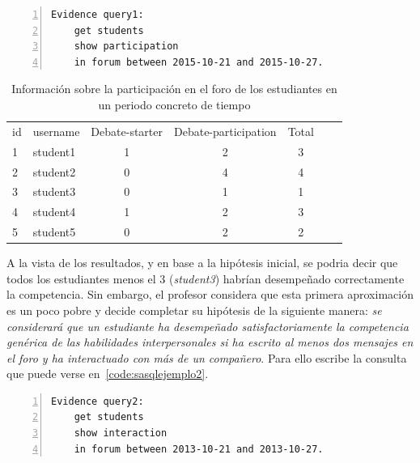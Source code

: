 \begin{lstlisting}[caption=Participación en el foro en un periodo concreto de tiempo ,label=code:sasqlejemplo1,numbers=left, captionpos=b, morekeywords={Evidence,get, students, show, milestones, participation, access, in, assignment, forum, campus, workshop, interaction, between, and}]
Evidence query1: 
	get students
	show participation
	in forum between 2015-10-21 and 2015-10-27.
\end{lstlisting}

\begin{table}
	\centering
	\caption{Información sobre la participación en el foro de los estudiantes en un periodo concreto de tiempo}
	\label{tab:EvalCourseEj1}
	\begin{tabular}{llccccc}
		\hline\noalign{\smallskip}
		id & username & Debate-starter & Debate-participation & Total \\
		\noalign{\smallskip}
		\hline
		\noalign{\smallskip}
		1 & student1 & 1 & 2 & 3  \\
		2 & student2 & 0 & 4 & 4  \\
		3 & student3 & 0 & 1 & 1  \\
		4 & student4 & 1 & 2 & 3  \\
		5 & student5 & 0 & 2 & 2  \\
		\hline
	\end{tabular}
\end{table}

A la vista de los resultados, y en base a la hipótesis inicial, se podria decir que todos los estudiantes menos el 3 (\emph{student3}) habrían desempeñado correctamente la competencia. Sin embargo, el profesor considera que esta primera aproximación es un poco pobre y decide completar su hipótesis de la siguiente manera: \emph{se considerará que un estudiante ha desempeñado satisfactoriamente la competencia genérica de las habilidades interpersonales si ha escrito al menos dos mensajes en el foro y ha interactuado con más de un compañero}. Para ello escribe la consulta que puede verse en~\ref{code:sasqlejemplo2}. 

\begin{lstlisting}[caption=Interacción en el foro en un periodo de tiempo ,label=code:sasqlejemplo2,numbers=left, captionpos=b, morekeywords={Evidence,get, students, show, milestones, participation, access, in, assignment, forum, campus, workshop, interaction, between, and}]
Evidence query2: 
	get students
	show interaction
	in forum between 2013-10-21 and 2013-10-27.
\end{lstlisting}

